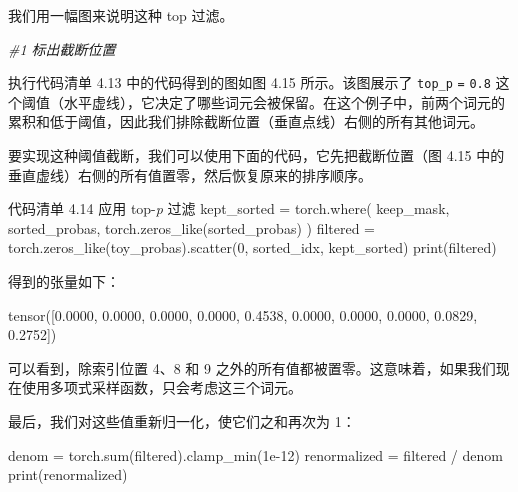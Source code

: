 我们用一幅图来说明这种 top 过滤。

{\noindent\small\textit{\#1 标出截断位置}\par}

执行代码清单 4.13 中的代码得到的图如图 4.15 所示。该图展示了 \texttt{top\_p} \texttt{=} \texttt{0.8} 这个阈值（水平虚线），它决定了哪些词元会被保留。在这个例子中，前两个词元的累积和低于阈值，因此我们排除截断位置（垂直点线）右侧的所有其他词元。


要实现这种阈值截断，我们可以使用下面的代码，它先把截断位置（图 4.15 中的垂直虚线）右侧的所有值置零，然后恢复原来的排序顺序。

\begin{codeboxt}{代码清单 4.14 应用 top-\emph{p} 过滤}
kept_sorted = torch.where(
    keep_mask, sorted_probas,
    torch.zeros_like(sorted_probas)
)
filtered = torch.zeros_like(toy_probas).scatter(0, sorted_idx, kept_sorted)
print(filtered)
\end{codeboxt}

得到的张量如下：

\begin{codebox}
tensor([0.0000, 0.0000, 0.0000, 0.0000, 0.4538, 0.0000, 0.0000, 0.0000, 0.0829, 0.2752])
\end{codebox}

可以看到，除索引位置 4、8 和 9 之外的所有值都被置零。这意味着，如果我们现在使用多项式采样函数，只会考虑这三个词元。

最后，我们对这些值重新归一化，使它们之和再次为 1：

\begin{codebox}
denom = torch.sum(filtered).clamp_min(1e-12)
renormalized = filtered / denom
print(renormalized)
\end{codebox}

